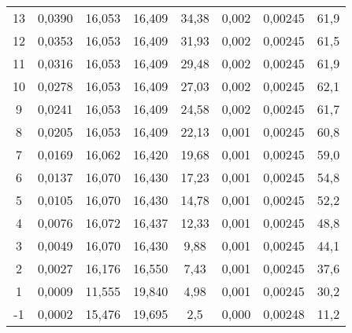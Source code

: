 \begin{table}[H]
{\begin{tabular}{cccccccc}
    13 &
      0,0390 &
      16,053 &
      16,409 &
      34,38 &
      0,002 &
      0,00245 &
      61,9
      \\
    12 &
      0,0353 &
      16,053 &
      16,409 &
      31,93 &
      0,002 &
      0,00245 &
      61,5
      \\
    11 &
      0,0316 &
      16,053 &
      16,409 &
      29,48 &
      0,002 &
      0,00245 &
      61,9
      \\
    10 &
      0,0278 &
      16,053 &
      16,409 &
      27,03 &
      0,002 &
      0,00245 &
      62,1
      \\
    9 &
      0,0241 &
      16,053 &
      16,409 &
      24,58 &
      0,002 &
      0,00245 &
      61,7
      \\
    8 &
      0,0205 &
      16,053 &
      16,409 &
      22,13 &
      0,001 &
      0,00245 &
      60,8
      \\
    7 &
      0,0169 &
      16,062 &
      16,420 &
      19,68 &
      0,001 &
      0,00245 &
      59,0
      \\
    6 &
      0,0137 &
      16,070 &
      16,430 &
      17,23 &
      0,001 &
      0,00245 &
      54,8
      \\
    5 &
      0,0105 &
      16,070 &
      16,430 &
      14,78 &
      0,001 &
      0,00245 &
      52,2
      \\
    4 &
      0,0076 &
      16,072 &
      16,437 &
      12,33 &
      0,001 &
      0,00245 &
      48,8
      \\
    3 &
      0,0049 &
      16,070 &
      16,430 &
      9,88 &
      0,001 &
      0,00245 &
      44,1
      \\
    2 &
      0,0027 &
      16,176 &
      16,550 &
      7,43 &
      0,001 &
      0,00245 &
      37,6
      \\
    1 &
      0,0009 &
      11,555 &
      19,840 &
      4,98 &
      0,001 &
      0,00245 &
      30,2
      \\
    -1 &
      0,0002 &
      15,476 &
      19,695 &
      2,5 &
      0,000 &
      0,00248 &
      11,2
      \bigstrut[b]\\
    \hline
  \end{tabular}}
  \label{syCMD}
\end{table}

